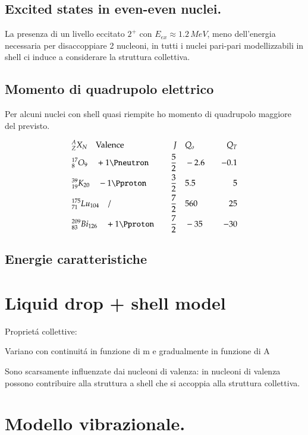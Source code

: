 \subsection{Excited states in even-even nuclei.}

La presenza di un livello eccitato $2^+$ con $E_{ex}\approx1.2\,MeV$, meno dell'energia necessaria per disaccoppiare 2 nucleoni, in tutti i nuclei pari-pari modellizzabili in shell ci induce a considerare la struttura collettiva.

\subsection{Momento di quadrupolo elettrico}

Per alcuni nuclei con shell quasi riempite ho momento di quadrupolo maggiore del previsto.

\begin{align*}
&^A_ZX_N\quad\text{Valence}\quad &J\quad &Q_o \quad &Q_T\\
&^{17}_8O_9 \quad+1\Pneutron \quad&\frac{5}{2} \quad&-2.6 \quad&-0.1 \\
&^{39}_{19}K_{20} \quad-1\Pproton \quad&\frac{3}{2} \quad&5.5 \quad&5 \\
&^{175}_{71}Lu_{104} \quad / \quad&\frac{7}{2} \quad&560\quad&25 \\
&^{209}_{83}Bi_{126}\quad+1\Pproton\quad&\frac{7}{2} \quad&-35\quad&-30
\end{align*}

\subsection{Energie caratteristiche}

\section{Liquid drop + shell model}

Propriet\'a collettive:
\begin{itemize*}
\item Variano con continuit\'a in funzione di m e gradualmente in funzione di A
\item Sono scarsamente influenzate dai nucleoni di valenza: in nucleoni di valenza possono contribuire alla struttura a shell che si accoppia alla struttura collettiva.
\end{itemize*}


\section{Modello vibrazionale.}

